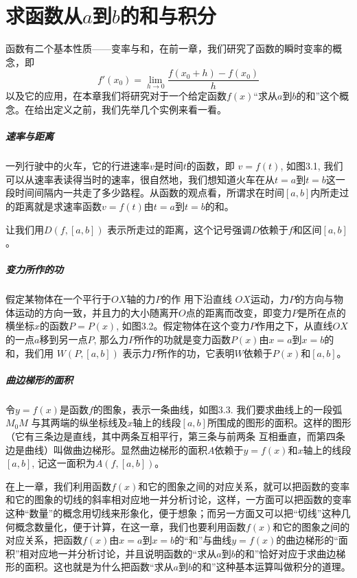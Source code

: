 \chapter{求函数从$a$到$b$的和与积分}
函数有二个基本性质——变率与和，在前一章，我们研究了函数的瞬时变率的概念，即
\[f'(x_0) =\lim_{h\to 0} \frac{f (x_0+h) -f (x_0)}{h}\]
以及它的应用，在本章我们将研究对于一个给定函数$f(x)$“求从$a$到$b$的和”这个概念。在给出定义之前，我们先举几个实例来看一看。

\paragraph{速率与距离} 
一列行驶中的火车，它的行进速率$v$是时间$t$的函数，即
$v=f(t)$, 如图3.1, 我们可以从速率表读得当时的速率，很自然地，我们想知道火车在从$t=a$到$t=b$这一段时间间隔内一共走了多少路程。从函数的观点看，所谓求在时间$[a,b]$内所走过的距离就是求速率函数$v=f(t)$由$t=a$到$t=b$的和。

让我们用$D(f,[a,b])$
表示所走过的距离，这个记号强调$D$依赖于$f$和区间$[a,b]$。

\paragraph{变力所作的功}

假定某物体在一个平行于$OX$轴的力$P$的作 用下沿直线
$OX$运动，力$P$的方向与物体运动的方向一致，并且力的大小随离开$O$点的距离而改变，即变力$P$是所在点的横坐标$x$的函数$P=P(x)$, 如图3.2。假定物体在这个变力$P$作用之下，从直线$OX$的一点$a$移到另一点$P$, 那么力$P$所作的功就是变力函数$P(x)$由$x=a$到$x=b$的和，我们用
$W (P, [a,b])$
表示力$P$所作的功，它表明$W$依赖于$P(x)$和$[a,b]$。

\paragraph{曲边梯形的面积}

令$y=f(x)$是函数$f$的图象，表示一条曲线，如图3.3. 我们要求曲线上的一段弧$M_0M$ 与其两端的纵坐标线及$x$轴上的线段$[a,b]$所围成的图形的面积。这样的图形（它有三条边是直线，其中两条互相平行，第三条与前两条
互相垂直，而第四条边是曲线）叫做曲边梯形。显然曲边梯形的面积$A$依赖于$y=f(x)$和$x$轴上的线段$[a,b]$, 记这一面积为$A (f, [a,b])$。

在上一章，我们利用函数$f(x)$和它的图象之间的对应关系，就可以把函数的变率和它的图象的切线的斜率相对应地一并分析讨论，这样，一方面可以把函数的变率这种“数量”的概念用切线来形象化，便于想象；而另一方面又可以把“切线”这种几何概念数量化，便于计算，在这一章，我们也要利用函数$f(x)$和它的图象之间的对应关系，把函数$f(x)$由$x=a$到$x=b$的“和”与曲线$y=f(x)$的曲边梯形的“面积”相对应地一并分析讨论，并且说明函数的“求从$a$到$b$的和”恰好对应于求曲边梯形的面积。这也就是为什么把函数“求从$a$到$b$的和”这种基本运算叫做积分的道理。

